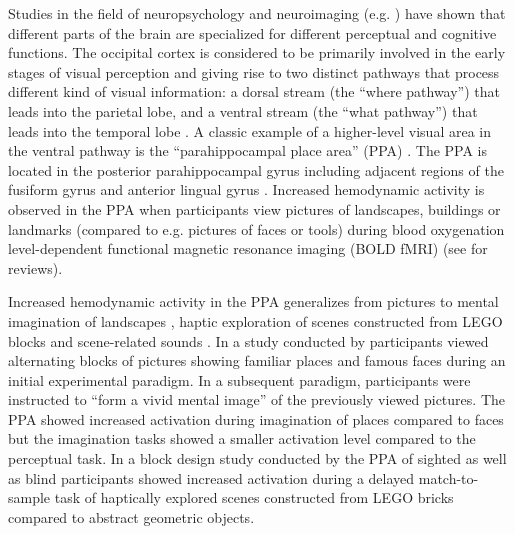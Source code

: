 \documentclass[english]{article}
\begin{document}
Studies in the field of neuropsychology and neuroimaging (e.g.
\citep{penfield1950cerebral, fox1984noninvasive}) have shown that different
parts of the brain are specialized for different perceptual and cognitive
functions.
The occipital cortex is considered to be primarily involved in the early stages
of visual perception and giving rise to two distinct pathways that process
different kind of visual information:
a dorsal stream (the ``where pathway'') that leads into the parietal lobe, and a
ventral stream (the ``what pathway'') that leads into the temporal lobe
\citep{goodale1992separate, mishkin1982contribution}.
A classic example of a higher-level visual area in the ventral pathway is the
``parahippocampal place area'' (PPA) \citep{epstein1998ppa,
epstein1999parahippocampal}.
The PPA is located in the posterior parahippocampal gyrus including adjacent
regions of the fusiform gyrus and anterior lingual gyrus
\citep{epstein2008parahippocampal}.
Increased hemodynamic activity is observed in the PPA when participants view
pictures of landscapes, buildings or landmarks (compared to e.g. pictures of
faces or tools) during blood oxygenation level-dependent functional magnetic
resonance imaging (BOLD fMRI) (see \citep{epstein2014neural, aminoff2013role}
for reviews).



Increased hemodynamic activity in the PPA generalizes from pictures to mental
imagination of landscapes \citep{ocraven2000mental}, haptic exploration of
scenes constructed from LEGO blocks \citep{wolbers2011modality} and
scene-related sounds \citep{van2017development}.
In a study conducted by \cite{ocraven2000mental} participants viewed alternating
blocks of pictures showing familiar places and famous faces during an initial
experimental paradigm.
In a subsequent paradigm, participants were instructed to ``form a vivid mental
image'' of the previously viewed pictures.
The PPA showed increased activation during imagination of places compared to
faces but the imagination tasks showed a smaller activation level compared to
the perceptual task.
In a block design study conducted by \cite{wolbers2011modality} the PPA of
sighted as well as blind participants showed increased activation during a
delayed match-to-sample task of haptically explored scenes constructed from LEGO
bricks compared to abstract geometric objects.
\end{document}
